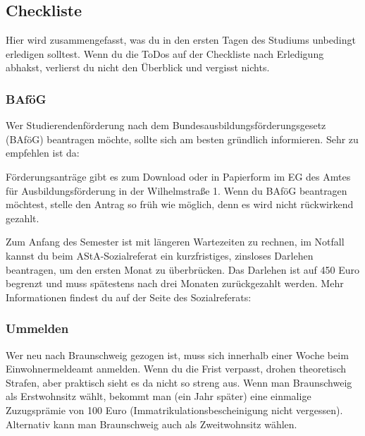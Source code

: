 
\subsection{Checkliste}
\label{checkliste}
	Hier wird zusammengefasst, was du in den ersten Tagen des Studiums unbedingt erledigen solltest. Wenn du die ToDos auf der Checkliste nach Erledigung abhakst, verlierst du nicht den Überblick und vergisst nichts.
	
\vspace*{0.5cm}


\begin{multicols}{2}

\subsubsection{BAföG}
	\label{todobafoeg}

	Wer Studierendenförderung nach dem Bundesausbildungsförderungsgesetz (BAföG) beantragen möchte, sollte sich am besten gründlich informieren. Sehr zu empfehlen ist da: \\
 
	Förderungsanträge gibt es zum Download oder in Papierform im EG des Amtes für Ausbildungsförderung in der Wilhelmstraße 1. Wenn du BAföG beantragen möchtest, stelle den Antrag so früh wie möglich, denn es wird nicht rückwirkend gezahlt.

	Zum Anfang des Semester ist mit längeren Wartezeiten zu rechnen, im Notfall kannst du beim AStA-Sozialreferat ein kurzfristiges, zinsloses Darlehen beantragen, um den ersten Monat zu überbrücken. Das Darlehen ist auf 450 Euro begrenzt und muss spätestens nach drei Monaten zurückgezahlt werden. Mehr Informationen findest du auf der Seite des Sozialreferats: 


\subsubsection{Ummelden}
	\label{todoummelden}

	Wer neu nach Braunschweig gezogen ist, muss sich innerhalb einer Woche beim Einwohnermeldeamt anmelden. Wenn du die Frist verpasst, drohen theoretisch Strafen, aber praktisch sieht es da nicht so streng aus. Wenn man Braunschweig als Erstwohnsitz wählt, bekommt man (ein Jahr später) eine einmalige Zuzugsprämie von 100 Euro (Immatrikulationsbescheinigung nicht vergessen). Alternativ kann man Braunschweig auch als Zweitwohnsitz wählen.


\end{multicols}
